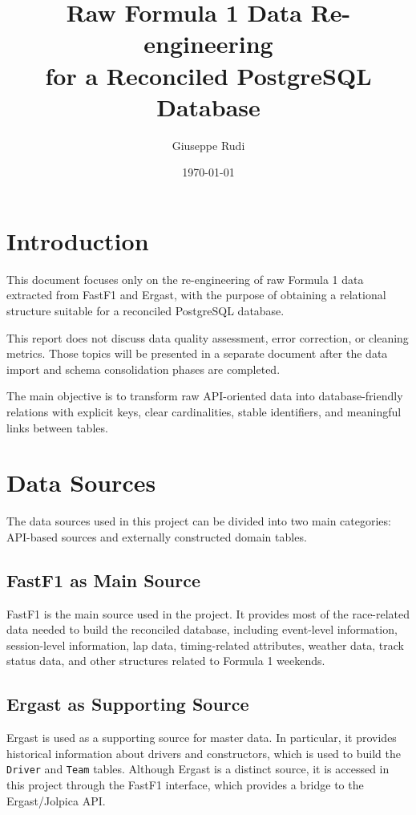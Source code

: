\documentclass[12pt,a4paper]{article}
\title{\textbf{Raw Formula 1 Data Re-engineering\\for a Reconciled PostgreSQL Database}}
\author{Giuseppe Rudi}
\date{\today}
\begin{document}
	
	\maketitle
	\tableofcontents
	\newpage
	
	\section{Introduction}
	
	This document focuses only on the re-engineering of raw Formula 1 data extracted from FastF1 and Ergast, with the purpose of obtaining a relational structure suitable for a reconciled PostgreSQL database.
	
	This report does not discuss data quality assessment, error correction, or cleaning metrics. Those topics will be presented in a separate document after the data import and schema consolidation phases are completed.
	

	
	The main objective is to transform raw API-oriented data into database-friendly relations with explicit keys, clear cardinalities, stable identifiers, and meaningful links between tables.
	
	\section{Data Sources}
	
	The data sources used in this project can be divided into two main categories:
	API-based sources and externally constructed domain tables.
	
	\subsection{FastF1 as Main Source}
	FastF1 is the main source used in the project.
	It provides most of the race-related data needed to build the reconciled database, including event-level information, session-level information, lap data, timing-related attributes, weather data, track status data, and other structures related to Formula 1 weekends.
	
	\subsection{Ergast as Supporting Source}
	Ergast is used as a supporting source for master data.
	In particular, it provides historical information about drivers and constructors, which is used to build the \texttt{Driver} and \texttt{Team} tables.
	Although Ergast is a distinct source, it is accessed in this project through the FastF1 interface, which provides a bridge to the Ergast/Jolpica API.
	
\end{document}
